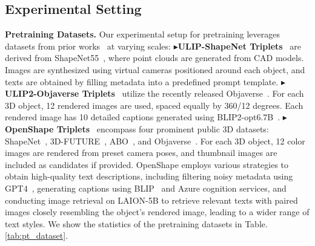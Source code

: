 \documentclass{article}
\newcommand{\dsA}{\textcolor{myyellow}{$\blacktriangleright$}}
\newcommand{\dsB}{{\textcolor{mygreen}{$\blacktriangleright$}}}
\newcommand{\dsC}{{\textcolor{mypurpledeep}{$\blacktriangleright$}}}
\begin{document}
\subsection{Experimental Setting}\label{sec:exp_setting}
\textbf{Pretraining Datasets.} Our experimental setup for pretraining leverages datasets from prior works~\cite{xue2023ulip,xue2023ulip2,liu2023openshape} at varying scales:
\dsA \textbf{ULIP-ShapeNet Triplets}~\cite{xue2023ulip} are derived from ShapeNet55~\cite{chang2015shapenet}, where point clouds are generated from CAD models. Images are synthesized using virtual cameras positioned around each object, and texts are obtained by filling metadata into a predefined prompt template.
\dsB \textbf{ULIP2-Objaverse Triplets}~\cite{xue2023ulip2} utilize the recently released Objaverse~\cite{deitke2023objaverse}. For each 3D object, 12 rendered images are used, spaced equally by 360/12 degrees. Each rendered image has 10 detailed captions generated using BLIP2-opt6.7B~\cite{blip2}.
\dsC \textbf{OpenShape Triplets}~\cite{liu2023openshape} encompass four prominent public 3D datasets: ShapeNet~\cite{chang2015shapenet}, 3D-FUTURE~\cite{fu2021-3d-future}, ABO~\cite{collins2022abo}, and Objaverse~\cite{deitke2023objaverse}. For each 3D object, 12 color images are rendered from preset camera poses, and thumbnail images are included as candidates if provided. OpenShape employs various strategies to obtain high-quality text descriptions, including filtering noisy metadata using GPT4~\cite{openai2023gpt4}, generating captions using BLIP~\cite{blip} and Azure cognition services, and conducting image retrieval on LAION-5B to retrieve relevant texts with paired images closely resembling the object's rendered image, leading to a wider range of text styles.
We show the statistics of the pretraining datasets in Table.\ref{tab:pt_dataset}.
\end{document}

